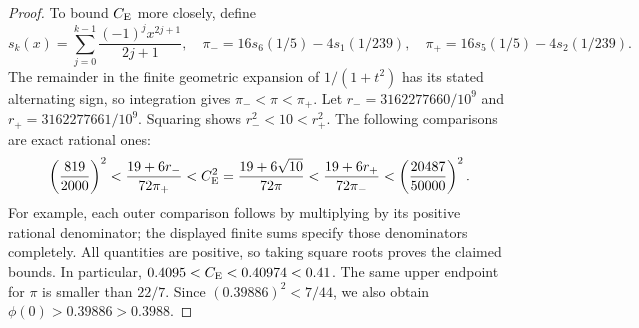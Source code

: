 \begin{proof}
To bound $C_{\mathrm E}$ more closely, define
\[
 s_k(x)=\sum_{j=0}^{k-1}\frac{(-1)^jx^{2j+1}}{2j+1},\quad
 \pi_-=16s_6(1/5)-4s_1(1/239),\quad
 \pi_+=16s_5(1/5)-4s_2(1/239).
\]
The remainder in the finite geometric expansion of $1/(1+t^2)$ has its
stated alternating sign, so integration gives $\pi_-<\pi<\pi_+$.
Let $r_-=3162277660/10^9$ and $r_+=3162277661/10^9$. Squaring shows
$r_-^2<10<r_+^2$. The following comparisons are exact rational ones:
\[
 \left(\frac{819}{2000}\right)^2
 <\frac{19+6r_-}{72\pi_+}
 <C_{\mathrm E}^2=\frac{19+6\sqrt{10}}{72\pi}
 <\frac{19+6r_+}{72\pi_-}
 <\left(\frac{20487}{50000}\right)^2.
\]
For example, each outer comparison follows by multiplying by its positive
rational denominator; the displayed finite sums specify those denominators
completely. All quantities are positive, so taking square roots proves the
claimed bounds. In particular, $0.4095<C_{\mathrm E}<0.40974<0.41$.
The same upper endpoint for $\pi$ is smaller than $22/7$.
Since $(0.39886)^2<7/44$, we also obtain
$\phi(0)>0.39886>0.3988$.
\end{proof}
